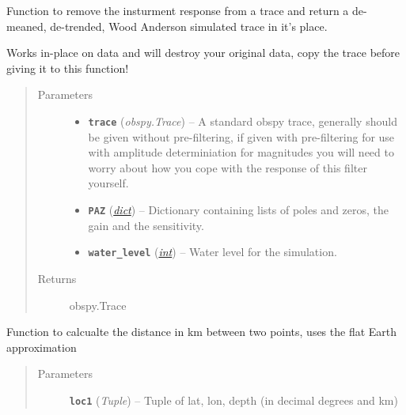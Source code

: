 \documentclass[a4paper,10pt,english]{sphinxmanual}
\begin{document}
\begin{fulllineitems}
\label{utils:mag_calc._sim_WA}
Function to remove the insturment response from a trace and return a
de-meaned, de-trended, Wood Anderson simulated trace in it's place.

Works in-place on data and will destroy your original data, copy the
trace before giving it to this function!
\begin{quote}\begin{description}
\item[{Parameters}] \leavevmode\begin{itemize}
\item {} 
\textbf{\texttt{trace}} (\emph{obspy.Trace}) -- A standard obspy trace, generally should be given without
pre-filtering, if given with pre-filtering for use with
amplitude determiniation for magnitudes you will need to
worry about how you cope with the response of this filter
yourself.

\item {} 
\textbf{\texttt{PAZ}} (\href{https://docs.python.org/library/stdtypes.html\#dict}{\emph{dict}}) -- Dictionary containing lists of poles and zeros, the gain and
the sensitivity.

\item {} 
\textbf{\texttt{water\_level}} (\href{https://docs.python.org/library/functions.html\#int}{\emph{int}}) -- Water level for the simulation.

\end{itemize}

\item[{Returns}] \leavevmode
obspy.Trace

\end{description}\end{quote}

\end{fulllineitems}


\begin{fulllineitems}
\label{utils:mag_calc.dist_calc}
Function to calcualte the distance in km between two points, uses the flat
Earth approximation
\begin{quote}\begin{description}
\item[{Parameters}] \leavevmode
\textbf{\texttt{loc1}} (\emph{Tuple}) -- Tuple of lat, lon, depth (in decimal degrees and km)

\end{description}\end{quote}

\end{fulllineitems}
\end{document}
